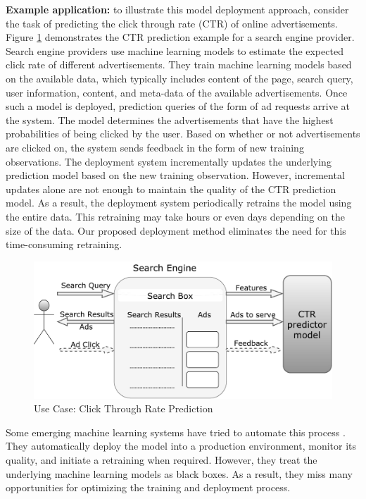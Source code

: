 \documentclass[10pt,conference,letterpaper]{IEEEtran}
\begin{document}
\textbf{Example application:} to illustrate this model deployment approach, consider the task of predicting the click through rate (CTR) of online advertisements.
Figure \ref{fig:click-rate} demonstrates the CTR prediction example for a search engine provider.
Search engine providers use machine learning models to estimate the expected click rate of different advertisements.
They train machine learning models based on the available data, which typically includes content of the page, search query, user information, content, and meta-data of the available advertisements. 
Once such a model is deployed, prediction queries of the form of ad requests arrive at the system.
The model determines the advertisements that have the highest probabilities of being clicked by the user.
Based on whether or not advertisements are clicked on, the system sends feedback in the form of new training observations.
The deployment system incrementally updates the underlying prediction model based on the new training observation. 
However, incremental updates alone are not enough to maintain the quality of the CTR prediction model.
As a result, the deployment system periodically retrains the model using the entire data.
This retraining may take hours or even days depending on the size of the data.
Our proposed deployment method eliminates the need for this time-consuming retraining.

\begin{figure}[h]
\centering
\includegraphics[width=\columnwidth]{../images/use-case-final.pdf}
\caption{Use Case: Click Through Rate Prediction}
\label{fig:click-rate}
\end{figure}

Some emerging machine learning systems have tried to automate this process \cite{crankshaw2014missing}.
They automatically deploy the model into a production environment, monitor its quality, and initiate a retraining when required.
However, they treat the underlying machine learning models as black boxes. 
As a result, they miss many opportunities for optimizing the training and deployment process.
\end{document}
